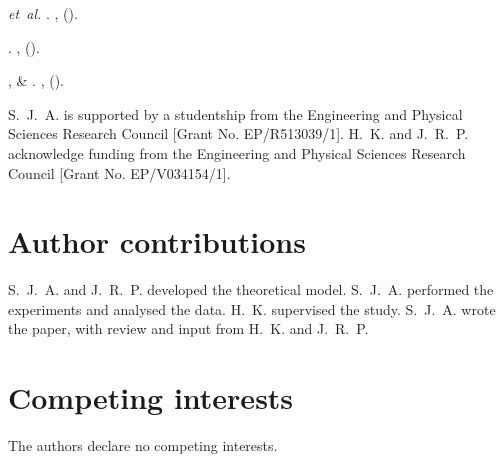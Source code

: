 \documentclass[twocolumn,10pt]{revtex4}
\begin{document}
\begin{thebibliography}{10}
 \emph{et~al.}
\newblock {}.
\newblock \emph{} \textbf{},
   ().

\newblock {}.
\newblock \emph{}
  \textbf{}, 
  ().

,  \&
\newblock {}.
\newblock \emph{} \textbf{},
   ().

\end{thebibliography}

\begin{acknowledgments}
  S.~J.~A. is supported by a studentship from the Engineering and Physical Sciences Research Council [Grant No. EP/R513039/1].
  H.~K. and J.~R.~P. acknowledge funding from the Engineering and Physical Sciences Research Council [Grant No. EP/V034154/1].
\end{acknowledgments}

\section*{Author contributions}
S.~J.~A. and J.~R.~P. developed the theoretical model.
S.~J.~A. performed the experiments and analysed the data.
H.~K. supervised the study.
S.~J.~A. wrote the paper, with review and input from H.~K. and J.~R.~P.

\section*{Competing interests}
The authors declare no competing interests.
\end{document}
